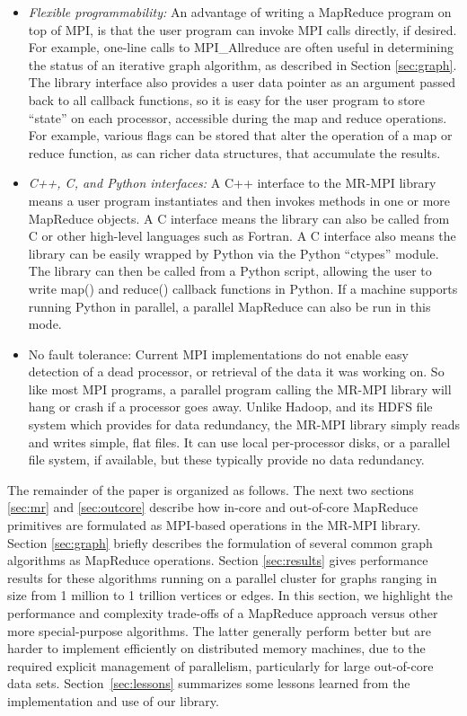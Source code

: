\begin{itemize}
\item {\it Flexible programmability:} An advantage of writing a
MapReduce program on top of MPI, is that the user program can invoke
MPI calls directly, if desired.  For example, one-line calls to
MPI\_Allreduce are often useful in determining the status of an
iterative graph algorithm, as described in Section \ref{sec:graph}.
The library interface also provides a user data pointer as an argument
passed back to all callback functions, so it is easy for the user
program to store ``state'' on each processor, accessible during the
map and reduce operations.  For example, various flags can be stored
that alter the operation of a map or reduce function, as can richer
data structures, that accumulate the results.

\item {\it C++, C, and Python interfaces:} A C++ interface to the
MR-MPI library means a user program instantiates and then invokes
methods in one or more MapReduce objects.  A C interface means the
library can also be called from C or other high-level languages such as
Fortran.  A C interface also means the library can be easily wrapped
by Python via the Python ``ctypes'' module.  The library can then be
called from a Python script, allowing the user to write map() and
reduce() callback functions in Python.  If a machine supports running
Python in parallel, a parallel MapReduce can also be run in this mode.

\item {No fault tolerance:} Current MPI implementations do not enable
easy detection of a dead processor, or retrieval of the data it was
working on.  So like most MPI programs, a parallel program calling the
MR-MPI library will hang or crash if a processor goes away.  Unlike
Hadoop, and its HDFS file system which provides for data redundancy,
the MR-MPI library simply reads and writes simple, flat files.  It can
use local per-processor disks, or a parallel file system, if
available, but these typically provide no data redundancy.

\end{itemize}

The remainder of the paper is organized as follows.  The next two
sections \ref{sec:mr} and \ref{sec:outcore} describe how in-core and
out-of-core MapReduce primitives are formulated as MPI-based
operations in the MR-MPI library.  Section \ref{sec:graph} briefly
describes the formulation of several common graph algorithms as
MapReduce operations.  Section \ref{sec:results} gives performance
results for these algorithms running on a parallel cluster for graphs
ranging in size from 1 million to 1 trillion vertices or edges.  In
this section, we highlight the performance and complexity trade-offs
of a MapReduce approach versus other more special-purpose algorithms.
The latter generally perform better but are harder to implement
efficiently on distributed memory machines, due to the required
explicit management of parallelism, particularly for large out-of-core
data sets.  Section~\ref{sec:lessons} summarizes some lessons learned
from the implementation and use of our library.
